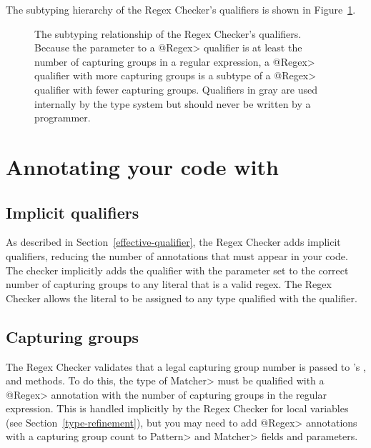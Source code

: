 The subtyping hierarchy of the Regex Checker's qualifiers is shown in
Figure~\ref{fig-regex-hierarchy}.

\begin{figure}
\caption{The subtyping relationship of the Regex Checker's qualifiers.
  Because the parameter to a \<@Regex> qualifier is at least the number of
  capturing groups in a regular expression, a \<@Regex> qualifier with more
  capturing groups is a subtype of a \<@Regex> qualifier with fewer capturing
  groups. Qualifiers in gray are used internally by the type
  system but should never be written by a programmer.}
\label{fig-regex-hierarchy}
\end{figure}

\section{Annotating your code with \label{annotating-with-regex}}


\subsection{Implicit qualifiers\label{regex-implicit-qualifiers}}

As described in Section~\ref{effective-qualifier}, the Regex Checker adds
implicit qualifiers, reducing the number of annotations that must appear
in your code. The checker implicitly adds the  qualifier with
the parameter set to the correct number of capturing groups to
any  literal that is a valid regex. The Regex Checker allows
the  literal to be assigned to any type qualified with the
 qualifier.


\subsection{Capturing groups\label{regex-capturing-groups}}

The Regex Checker validates that a legal capturing group number is passed
to 's
,
 and
 methods. To do this,
the type of \<Matcher> must be qualified with a \<@Regex> annotation
with the number of capturing groups in the regular expression. This is
handled implicitly by the Regex Checker for local variables (see
Section~\ref{type-refinement}), but you may need to add \<@Regex> annotations
with a capturing group count to \<Pattern> and \<Matcher> fields and
parameters.



